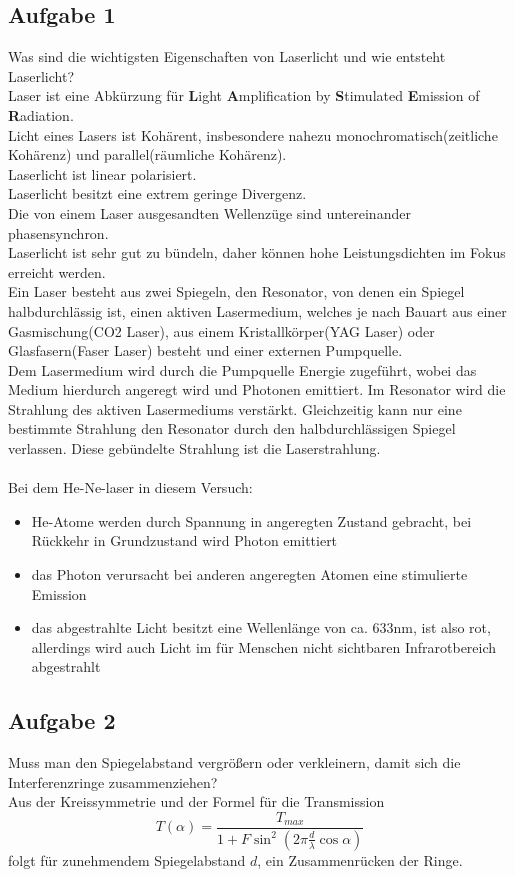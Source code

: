 \documentclass[a4paper,10pt]{scrartcl}
\begin{document}
	\subsection{Aufgabe 1}
	Was sind die wichtigsten Eigenschaften von Laserlicht und wie entsteht Laserlicht? \\
	Laser ist eine Abkürzung für \textbf Light \textbf Amplification by \textbf Stimulated \textbf Emission of \textbf Radiation.\\
	Licht eines Lasers ist Kohärent, insbesondere nahezu monochromatisch(zeitliche Kohärenz) und parallel(räumliche Kohärenz).\\
	Laserlicht ist linear polarisiert.\\
	Laserlicht besitzt eine extrem geringe Divergenz.\\
	Die von einem Laser ausgesandten Wellenzüge sind untereinander phasensynchron.\\
	Laserlicht ist sehr gut zu bündeln, daher können hohe Leistungsdichten im Fokus erreicht werden.\\
	Ein Laser besteht aus zwei Spiegeln, den Resonator, von denen ein Spiegel halbdurchlässig ist, einen aktiven Lasermedium, welches je nach Bauart aus einer Gasmischung(CO2 Laser), aus einem Kristallkörper(YAG Laser) oder Glasfasern(Faser Laser) besteht und einer externen Pumpquelle.\\
	Dem Lasermedium wird durch die Pumpquelle Energie zugeführt, wobei das Medium hierdurch angeregt wird und Photonen emittiert. Im Resonator wird die Strahlung des aktiven Lasermediums verstärkt. Gleichzeitig kann nur eine bestimmte Strahlung den Resonator durch den halbdurchlässigen Spiegel verlassen. Diese gebündelte Strahlung ist die Laserstrahlung.\\
	\\
	Bei dem He-Ne-laser in diesem Versuch:\\
	\begin{itemize}
		\item He-Atome werden durch Spannung in angeregten Zustand gebracht, bei Rückkehr in Grundzustand wird Photon emittiert
		\item das Photon verursacht bei anderen angeregten Atomen eine stimulierte Emission
		\item das abgestrahlte Licht besitzt eine Wellenlänge von ca. 633nm, ist also rot, allerdings wird auch Licht im für Menschen nicht sichtbaren Infrarotbereich abgestrahlt
	\end{itemize}
	\subsection{Aufgabe 2}
	Muss man den Spiegelabstand vergrößern oder verkleinern, damit sich die Interferenzringe
	zusammenziehen?\\
	Aus der Kreissymmetrie und der Formel für die Transmission
	\[
	T(\alpha)=\frac{T_{max}}{1+F\sin^{2}(2 \pi\frac{d}{\lambda}\cos\alpha)}
	\]
	folgt für zunehmendem Spiegelabstand $d$, ein Zusammenrücken der Ringe.\\
\end{document}
